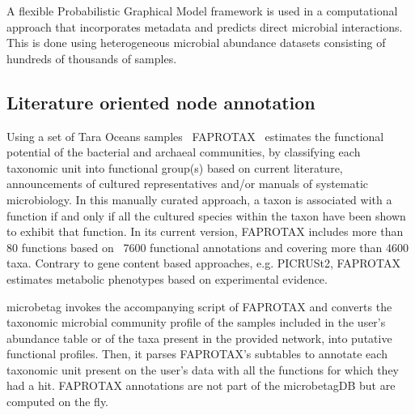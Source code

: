 \documentclass[sn-mathphys,Numbered]{sn-jnl}%
\theoremstyle{thmstyleone}%
\theoremstyle{thmstyletwo}%
\theoremstyle{thmstylethree}%
\begin{document}
        A flexible Probabilistic Graphical Model framework is used in a computational approach that 
        incorporates metadata and predicts direct microbial interactions. 
        This is done using heterogeneous microbial abundance datasets consisting of hundreds of thousands of samples.





    \subsection*{ Literature oriented node annotation }
        \label{subsec:fapro}

        Using a set of Tara Oceans samples~\cite{sunagawa2015structure} FAPROTAX~\cite{louca2016decoupling} estimates the functional potential of the bacterial and archaeal communities, by classifying each taxonomic unit into functional group(s) based on current literature,
        announcements of cultured representatives and/or manuals of systematic microbiology. 
        In this manually curated approach, a taxon is associated with a function if and only if all the cultured species within the taxon have been shown to exhibit that function. 
        In its current version, FAPROTAX includes more than 80 functions based on ~7600 functional annotations and covering more than 4600 taxa.
        Contrary to gene content based approaches, e.g. PICRUSt2, FAPROTAX  estimates metabolic phenotypes based on experimental evidence. 

        microbetag invokes the accompanying script of FAPROTAX and converts the taxonomic microbial community profile of the samples included in the user's abundance table or of the taxa present in the provided network, into putative functional profiles.
        Then, it parses FAPROTAX's subtables to annotate each taxonomic unit present on the user's data with all the functions for which they had a hit. 
        FAPROTAX annotations are not part of the microbetagDB but are computed on the fly.
\end{document}
